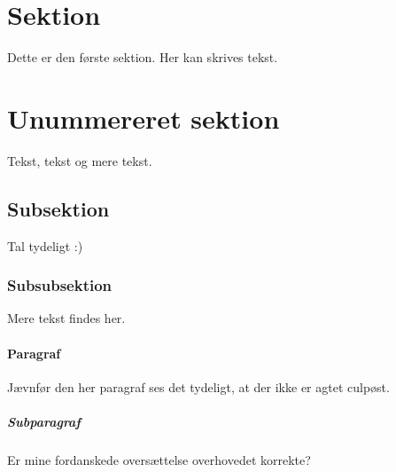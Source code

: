 \section{Sektion}
Dette er den første sektion. Her kan skrives tekst.

\section*{Unummereret sektion}
Tekst, tekst og mere tekst.
\subsection{Subsektion}
Tal tydeligt :)
\subsubsection{Subsubsektion}
Mere tekst findes her.
\paragraph{Paragraf}
Jævnfør den her paragraf ses det tydeligt, at der ikke er agtet culpøst.
\subparagraph{Subparagraf}
Er mine fordanskede oversættelse overhovedet korrekte?
